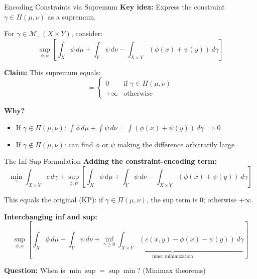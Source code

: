\documentclass[aspectratio=169]{beamer}
\newcommand{\Mm}{\mathcal{M}}
\begin{document}
\begin{frame}{Encoding Constraints via Supremum}
\textbf{Key idea:} Express the constraint $\gamma \in \Pi(\mu,\nu)$ as a supremum.

\vspace{0.3cm}
For $\gamma \in \Mm_+(X \times Y)$, consider:
\[
\sup_{\phi, \psi} \left[ \int_X \phi \, d\mu + \int_Y \psi \, d\nu - \int_{X \times Y} (\phi(x) + \psi(y)) \, d\gamma \right]
\]

\vspace{0.2cm}
\textbf{Claim:} This supremum equals:
\[
= \begin{cases}
0 & \text{if } \gamma \in \Pi(\mu,\nu) \\
+\infty & \text{otherwise}
\end{cases}
\]

\vspace{0.3cm}
\textbf{Why?}
\begin{itemize}
    \item If $\gamma \in \Pi(\mu,\nu)$: $\int \phi \, d\mu + \int \psi \, d\nu = \int (\phi(x) + \psi(y)) \, d\gamma$ \quad $\Rightarrow 0$
    \item If $\gamma \notin \Pi(\mu,\nu)$: can find $\phi$ or $\psi$ making the difference arbitrarily large
\end{itemize}
\end{frame}

\begin{frame}{The Inf-Sup Formulation}
\textbf{Adding the constraint-encoding term:}
\[
\min_\gamma \int_{X \times Y} c \, d\gamma + \sup_{\phi,\psi} \left[ \int_X \phi \, d\mu + \int_Y \psi \, d\nu - \int_{X \times Y} (\phi(x) + \psi(y)) \, d\gamma \right]
\]

\vspace{0.3cm}
This equals the original (KP): if $\gamma \in \Pi(\mu,\nu)$, the sup term is 0; otherwise $+\infty$.

\vspace{0.4cm}
\textbf{Interchanging inf and sup:}
\[
\boxed{\sup_{\phi,\psi} \left[ \int_X \phi \, d\mu + \int_Y \psi \, d\nu + \underbrace{\inf_{\gamma \geq 0} \int_{X \times Y} (c(x,y) - \phi(x) - \psi(y)) \, d\gamma}_{\text{inner minimization}} \right]}
\]

\vspace{0.3cm}
\textbf{Question:} When is $\min \sup = \sup \min$? (Minimax theorems)
\end{frame}
\end{document}

